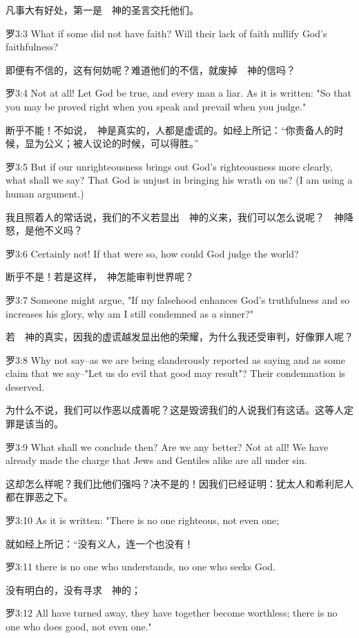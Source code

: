 \documentclass[a4paper,11pt,onecolumn,twoside]{ctexart}
\begin{document}
\begin{multicols}{2}
 凡事大有好处，第一是　神的圣言交托他们。


 罗3:3
 What if some did not have faith? Will their lack of faith nullify God's faithfulness?

 即便有不信的，这有何妨呢？难道他们的不信，就废掉　神的信吗？


 罗3:4
 Not at all! Let God be true, and every man a liar. As it is written: "So that you may be proved right when you speak and prevail when you judge."

 断乎不能！不如说，　神是真实的，人都是虚谎的。如经上所记：“你责备人的时候，显为公义；被人议论的时候，可以得胜。”


 罗3:5
 But if our unrighteousness brings out God's righteousness more clearly, what shall we say? That God is unjust in bringing his wrath on us? (I am using a human argument.)

 我且照着人的常话说，我们的不义若显出　神的义来，我们可以怎么说呢？　神降怒，是他不义吗？


 罗3:6
 Certainly not! If that were so, how could God judge the world?

 断乎不是！若是这样，　神怎能审判世界呢？


 罗3:7
 Someone might argue, "If my falsehood enhances God's truthfulness and so increases his glory, why am I still condemned as a sinner?"

 若　神的真实，因我的虚谎越发显出他的荣耀，为什么我还受审判，好像罪人呢？


 罗3:8
 Why not say--as we are being slanderously reported as saying and as some claim that we say--"Let us do evil that good may result"? Their condemnation is deserved.

 为什么不说，我们可以作恶以成善呢？这是毁谤我们的人说我们有这话。这等人定罪是该当的。


 罗3:9
 What shall we conclude then? Are we any better? Not at all! We have already made the charge that Jews and Gentiles alike are all under sin.

 这却怎么样呢？我们比他们强吗？决不是的！因我们已经证明：犹太人和希利尼人都在罪恶之下。


 罗3:10
 As it is written: "There is no one righteous, not even one;

 就如经上所记：“没有义人，连一个也没有！


 罗3:11
 there is no one who understands, no one who seeks God.

 没有明白的，没有寻求　神的；


 罗3:12
 All have turned away, they have together become worthless; there is no one who does good, not even one."


\end{multicols}
\end{document}
